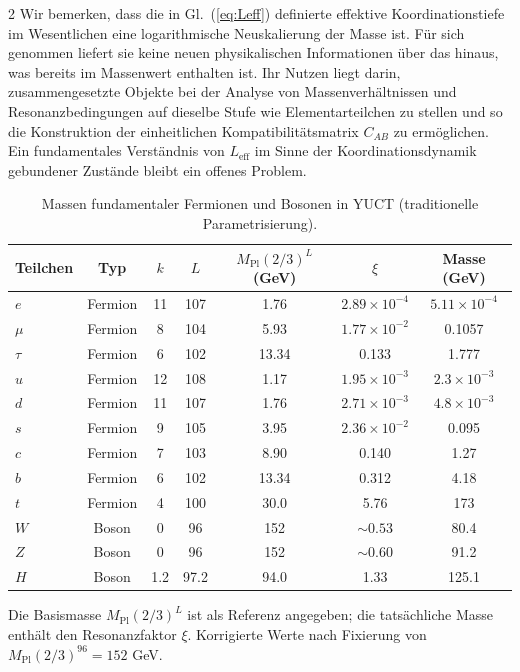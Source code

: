 \documentclass[11pt,a4paper]{article}
\begin{document}
\begin{multicols}{2}
		Wir bemerken, dass die in Gl.~(\ref{eq:Leff}) definierte effektive Koordinationstiefe im Wesentlichen eine logarithmische Neuskalierung der Masse ist. Für sich genommen liefert sie keine neuen physikalischen Informationen über das hinaus, was bereits im Massenwert enthalten ist. Ihr Nutzen liegt darin, zusammengesetzte Objekte bei der Analyse von Massenverhältnissen und Resonanzbedingungen auf dieselbe Stufe wie Elementarteilchen zu stellen und so die Konstruktion der einheitlichen Kompatibilitätsmatrix \(C_{AB}\) zu ermöglichen. Ein fundamentales Verständnis von \(L_{\mathrm{eff}}\) im Sinne der Koordinationsdynamik gebundener Zustände bleibt ein offenes Problem.
		
	\end{multicols}
	
	\vspace{2.0cm}
	
	\begin{table}[H]
		\centering
		\caption{Massen fundamentaler Fermionen und Bosonen in YUCT (traditionelle Parametrisierung).}
		\label{tab:fermions}
		\normalsize
		\begin{tabular}{l c c c c c c}
			\toprule
			Teilchen & Typ & \(k\) & \(L\) & \(M_{\mathrm{Pl}}(2/3)^L\) (GeV) & \(\xi\) & Masse (GeV) \\
			\midrule
			\(e\) & Fermion & 11 & 107 & 1.76 & \(2.89\times10^{-4}\) & \(5.11\times10^{-4}\) \\
			\(\mu\) & Fermion & 8  & 104 & 5.93 & \(1.77\times10^{-2}\) & 0.1057 \\
			\(\tau\) & Fermion & 6  & 102 & 13.34 & 0.133 & 1.777 \\
			\(u\) & Fermion & 12 & 108 & 1.17 & \(1.95\times10^{-3}\) & \(2.3\times10^{-3}\) \\
			\(d\) & Fermion & 11 & 107 & 1.76 & \(2.71\times10^{-3}\) & \(4.8\times10^{-3}\) \\
			\(s\) & Fermion & 9  & 105 & 3.95 & \(2.36\times10^{-2}\) & 0.095 \\
			\(c\) & Fermion & 7  & 103 & 8.90 & 0.140 & 1.27 \\
			\(b\) & Fermion & 6  & 102 & 13.34 & 0.312 & 4.18 \\
			\(t\) & Fermion & 4  & 100 & 30.0 & 5.76 & 173 \\
			\midrule
			\(W\) & Boson & 0 & 96 & 152 & \(\sim0.53\) & 80.4 \\
			\(Z\) & Boson & 0 & 96 & 152 & \(\sim0.60\) & 91.2 \\
			\(H\) & Boson & 1.2 & 97.2 & 94.0 & 1.33 & 125.1 \\
			\bottomrule
		\end{tabular}
		\par\smallskip
		\footnotesize Die Basismasse \(M_{\mathrm{Pl}}(2/3)^L\) ist als Referenz angegeben; die tatsächliche Masse enthält den Resonanzfaktor \(\xi\). Korrigierte Werte nach Fixierung von \(M_{\mathrm{Pl}}(2/3)^{96}=152\) GeV.
	\end{table}
	
\end{document}
